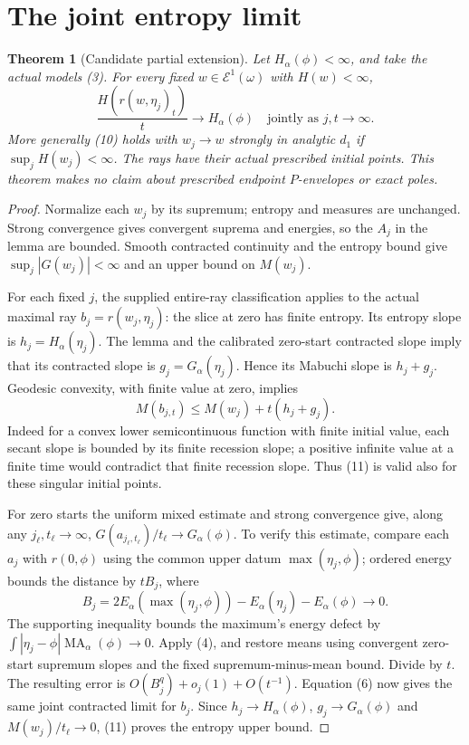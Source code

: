 \documentclass[11pt]{article}
\newcommand{\MA}{\operatorname{MA}}
\newcommand{\Eone}{\mathcal E^1}
\newtheorem{theorem}{Theorem}
\begin{document}
\section{The joint entropy limit}
\begin{theorem}[Candidate partial extension]
Let $H_\alpha(\phi)<\infty$, and take the actual models (3).
For every fixed $w\in\Eone(\omega)$ with $H(w)<\infty$,
\[
 \frac{H(r(w,\eta_j)_t)}t\longrightarrow H_\alpha(\phi)
 \quad\text{jointly as }j,t\longrightarrow\infty.         \tag{10}
\]
More generally (10) holds with $w_j\to w$ strongly in analytic $d_1$
if $\sup_j H(w_j)<\infty$. The rays have their actual prescribed
initial points. This theorem makes no claim about prescribed endpoint
$P$-envelopes or exact poles.
\end{theorem}
\begin{proof}
Normalize each $w_j$ by its supremum; entropy and measures are
unchanged. Strong convergence gives convergent suprema and energies,
so the $A_j$ in the lemma are bounded. Smooth contracted continuity
and the entropy bound give $\sup_j|G(w_j)|<\infty$ and an upper bound
on $M(w_j)$.

For each fixed $j$, the supplied entire-ray classification applies to
the actual maximal ray $b_j=r(w_j,\eta_j)$: the slice at zero has
finite entropy. Its entropy slope is $h_j=H_\alpha(\eta_j)$.
The lemma and the calibrated zero-start contracted slope imply that
its contracted slope is $g_j=G_\alpha(\eta_j)$. Hence its Mabuchi slope
is $h_j+g_j$. Geodesic convexity, with finite value at zero, implies
\[
 M(b_{j,t})\leq M(w_j)+t(h_j+g_j).                       \tag{11}
\]
Indeed for a convex lower semicontinuous function with finite initial
value, each secant slope is bounded by its finite recession slope;
a positive infinite value at a finite time would contradict that
finite recession slope. Thus (11) is valid also for these singular
initial points.

For zero starts the uniform mixed estimate and strong convergence
give, along any $j_\ell,t_\ell\to\infty$,
$G(a_{j_\ell,t_\ell})/t_\ell\to G_\alpha(\phi)$.
To verify this estimate, compare each $a_j$ with $r(0,\phi)$ using
the common upper datum $\max(\eta_j,\phi)$; ordered energy bounds
the distance by $tB_j$, where
\[
 B_j=2E_\alpha(\max(\eta_j,\phi))
            -E_\alpha(\eta_j)-E_\alpha(\phi)\longrightarrow0.
\]
The supporting inequality bounds the maximum's energy defect by
$\int|\eta_j-\phi|\MA_\alpha(\phi)\to0$.
Apply (4), and restore means using convergent zero-start supremum
slopes and the fixed supremum-minus-mean bound. Divide by $t$.
The resulting error is $O(B_j^q)+o_j(1)+O(t^{-1})$.
Equation (6) now gives the same joint contracted limit for $b_j$.
Since $h_j\to H_\alpha(\phi)$, $g_j\to G_\alpha(\phi)$ and
$M(w_j)/t_\ell\to0$, (11) proves the entropy upper bound.


\end{proof}
\end{document}
